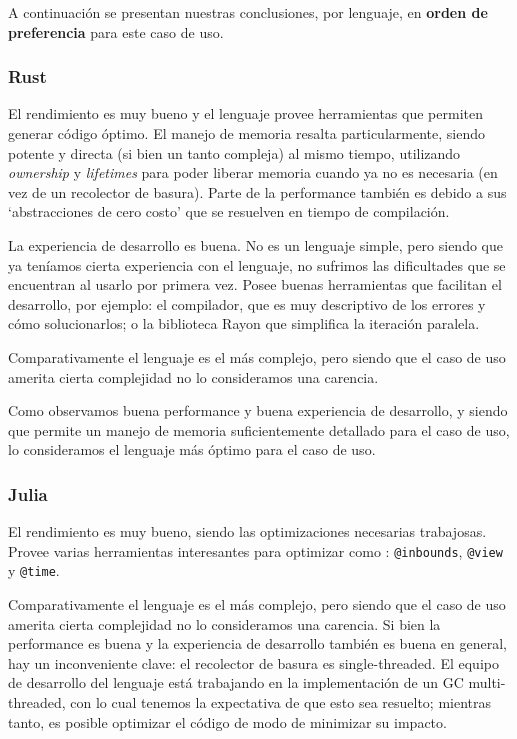 \documentclass[11pt]{article}
\let\Oldsubsubsection\subsubsection
\renewcommand{\subsubsection}{\FloatBarrier\Oldsubsubsection}
\begin{document}
A continuación se presentan nuestras conclusiones, por lenguaje, en \textbf{orden de preferencia} para este caso de uso.

\subsubsection{Rust}

El rendimiento es muy bueno y el lenguaje provee herramientas que permiten generar código óptimo. El manejo de memoria resalta particularmente, siendo potente y directa (si bien un tanto compleja) al mismo tiempo, utilizando \textit{ownership} y \textit{lifetimes} para poder liberar memoria cuando ya no es necesaria (en vez de un recolector de basura). Parte de la performance también es debido a sus ‘abstracciones de cero costo’ que se resuelven en tiempo de compilación.

La experiencia de desarrollo es buena. No es un lenguaje simple, pero siendo que ya teníamos cierta experiencia con el lenguaje, no sufrimos las dificultades que se encuentran al usarlo por primera vez. Posee buenas herramientas que facilitan el desarrollo, por ejemplo: el compilador, que es muy descriptivo de los errores y cómo solucionarlos; o la biblioteca Rayon que simplifica la iteración paralela.

Comparativamente el lenguaje es el más complejo, pero siendo que el caso de uso amerita cierta complejidad no lo consideramos una carencia.

Como observamos buena performance y buena experiencia de desarrollo, y siendo que permite un manejo de memoria suficientemente detallado para el caso de uso, lo consideramos el lenguaje más óptimo para el caso de uso.

\subsubsection{Julia}

El rendimiento es muy bueno, siendo las optimizaciones necesarias trabajosas. Provee varias herramientas interesantes para optimizar como : \texttt{@inbounds}, \texttt{@view} y \texttt{@time}.

Comparativamente el lenguaje es el más complejo, pero siendo que el caso de uso amerita cierta complejidad no lo consideramos una carencia.
Si bien la performance es buena y la experiencia de desarrollo también es buena en general, hay un inconveniente clave: el recolector de basura es single-threaded. El equipo de desarrollo del lenguaje está trabajando en la implementación de un GC multi-threaded, con lo cual tenemos la expectativa de que esto sea resuelto; mientras tanto, es posible optimizar el código de modo de minimizar su impacto.
\end{document}
